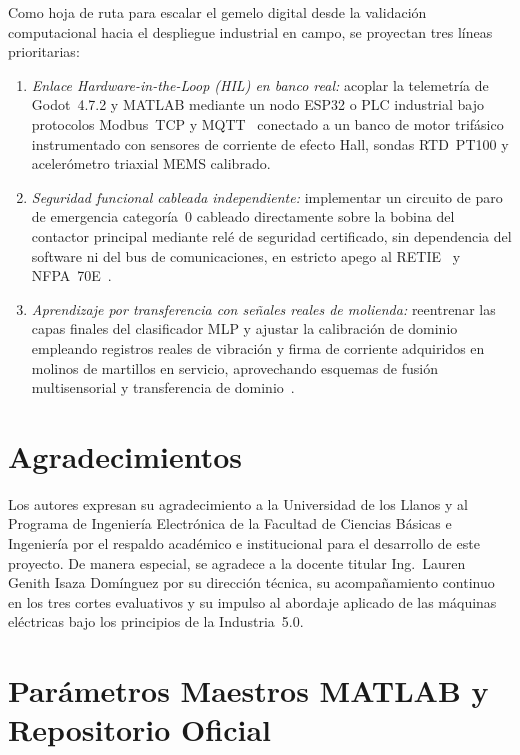 Como hoja de ruta para escalar el gemelo digital desde la validaci\'on
computacional hacia el despliegue industrial en campo, se proyectan tres
l\'ineas prioritarias:
\begin{enumerate}
  \item \emph{Enlace Hardware-in-the-Loop (HIL) en banco real:} acoplar la
  telemetr\'ia de Godot~4.7.2 y MATLAB mediante un nodo ESP32 o PLC industrial
  bajo protocolos Modbus~TCP y MQTT~\cite{EdgeCloud2022,Fog2025} conectado a un
  banco de motor trif\'asico instrumentado con sensores de corriente de efecto
  Hall, sondas RTD~PT100 y aceler\'ometro triaxial MEMS calibrado.
  \item \emph{Seguridad funcional cableada independiente:} implementar un
  circuito de paro de emergencia categor\'ia~0 cableado directamente sobre la
  bobina del contactor principal mediante rel\'e de seguridad certificado, sin
  dependencia del software ni del bus de comunicaciones, en estricto apego al
  RETIE~\cite{RETIE2026} y NFPA~70E~\cite{NFPA70E}.
  \item \emph{Aprendizaje por transferencia con se\~nales reales de molienda:}
  reentrenar las capas finales del clasificador MLP y ajustar la calibraci\'on
  de dominio empleando registros reales de vibraci\'on y firma de corriente
  adquiridos en molinos de martillos en servicio, aprovechando esquemas de
  fusi\'on multisensorial y transferencia de dominio~\cite{SensorFusion2022,AI2026}.
\end{enumerate}

\section*{Agradecimientos}

Los autores expresan su agradecimiento a la Universidad de los Llanos y al
Programa de Ingenier\'ia Electr\'onica de la Facultad de Ciencias B\'asicas e
Ingenier\'ia por el respaldo acad\'emico e institucional para el desarrollo de
este proyecto. De manera especial, se agradece a la docente titular
Ing.\ Lauren Genith Isaza Dom\'inguez por su direcci\'on t\'ecnica, su
acompa\~namiento continuo en los tres cortes evaluativos y su impulso al
abordaje aplicado de las m\'aquinas el\'ectricas bajo los principios de la
Industria~5.0.

\appendices

\section{Par\'ametros Maestros MATLAB y Repositorio Oficial}\label{app:matlab}

